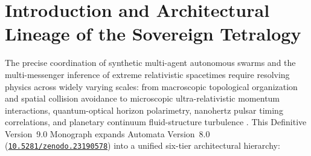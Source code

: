 \documentclass[11pt,a4paper,reqno]{article}
\newcommand{\zenodo}[1]{\href{https://doi.org/10.5281/zenodo.#1}{\texttt{10.5281/zenodo.#1}}}
\theoremstyle{plain}
\theoremstyle{definition}
\theoremstyle{remark}
\numberwithin{equation}{section}
\begin{document}
\section{Introduction and Architectural Lineage of the Sovereign Tetralogy}
The precise coordination of synthetic multi-agent autonomous swarms and the multi-messenger inference of extreme relativistic spacetimes require resolving physics across widely varying scales: from macroscopic topological organization and spatial collision avoidance to microscopic ultra-relativistic momentum interactions, quantum-optical horizon polarimetry, nanohertz pulsar timing correlations, and planetary continuum fluid-structure turbulence \cite{UnmaniV8Automata2026,Ananda2026SpdeV40,Ananda2026FiniteV80,UnmaniV7Automata2026,Ananda2026SpdeV30,Ananda2026TmdHashV11}. This Definitive Version~9.0 Monograph expands Automata Version~8.0 (\zenodo{23190578}) into a unified six-tier architectural hierarchy:
\end{document}
